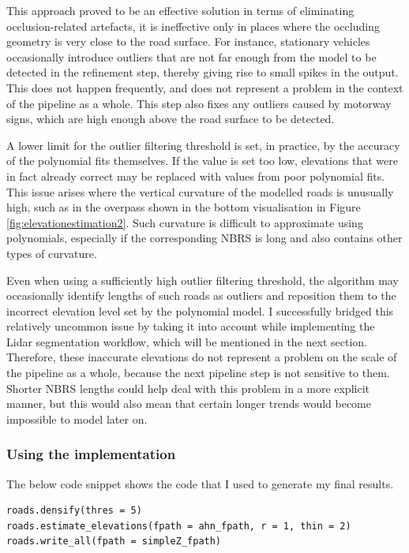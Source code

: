 This approach proved to be an effective solution in terms of eliminating occlusion-related artefacts, it is ineffective only in places where the occluding geometry is very close to the road surface. For instance, stationary vehicles occasionally introduce outliers that are not far enough from the model to be detected in the refinement step, thereby giving rise to small spikes in the output. This does not happen frequently, and does not represent a problem in the context of the pipeline as a whole. This step also fixes any outliers caused by motorway signs, which are high enough above the road surface to be detected.

A lower limit for the outlier filtering threshold is set, in practice, by the accuracy of the polynomial fits themselves. If the value is set too low, elevations that were in fact already correct may be replaced with values from poor polynomial fits. This issue arises where the vertical curvature of the modelled roads is unusually high, such as in the overpass shown in the bottom visualisation in Figure \ref{fig:elevationestimation2}. Such curvature is difficult to approximate using polynomials, especially if the corresponding NBRS is long and also contains other types of curvature.

Even when using a sufficiently high outlier filtering threshold, the algorithm may occasionally identify lengths of such roads as outliers and reposition them to the incorrect elevation level set by the polynomial model. I successfully bridged this relatively uncommon issue by taking it into account while implementing the Lidar segmentation workflow, which will be mentioned in the next section. Therefore, these inaccurate elevations do not represent a problem on the scale of the pipeline as a whole, because the next pipeline step is not sensitive to them. Shorter NBRS lengths could help deal with this problem in a more explicit manner, but this would also mean that certain longer trends would become impossible to model later on.

\subsubsection{Using the implementation}

The below code snippet shows the code that I used to generate my final results.

\begin{verbatim}
roads.densify(thres = 5)
roads.estimate_elevations(fpath = ahn_fpath, r = 1, thin = 2)
roads.write_all(fpath = simpleZ_fpath)
\end{verbatim}


